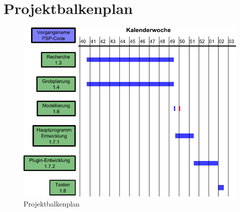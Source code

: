 \section{Projektbalkenplan}
\begin{figure}[!ht]
\includegraphics[width=\linewidth]{images/balkenplan}
\caption{Projektbalkenplan}
\end{figure}
